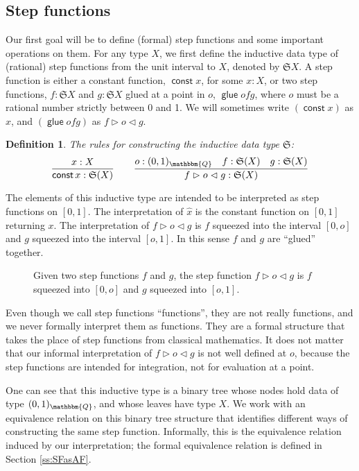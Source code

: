 \documentclass{elsarticle}
\newcommand{\tmop}[1]{\ensuremath{\operatorname{#1}}}
\newtheorem{definition}{Definition}
\newcommand{\SF}{\ensuremath{\mathfrak{S}}}
\newcommand{\glue}[3]{\ensuremath{#1 \vartriangleright #2 \vartriangleleft #3}}
\newcommand{\ou}{\ensuremath{(0,1)_{\mathbbm{Q}}}}
\begin{document}
\subsection{Step functions}\label{ss:Step}\label{ss:InductiveDef}Our first
goal will be to define (formal) step functions and some important
operations on them. For any type $X$, we first define the
inductive data type of (rational) step functions from the unit interval to
$X$, denoted by $\SF X$. A step function is either a constant function,
$\tmop{\mathsf{const}} x$, for some $x : X$, or two
step functions, $f : \SF X$ and $g : \SF X$ glued at a point in $o$,
$\tmop{\mathsf{glue}} o f g$, where $o$ must be a
rational number strictly between 0 and 1. We will sometimes write $( \tmop{\mathsf{const}} x)$ as
$\hat{x}$, and $(\tmop{\mathsf{glue}} o f g)$ as $\glue{f}{o}{g}$.

\begin{definition}
  The rules for constructing the inductive data type {\SF}:
          \[\frac{x : X}{\tmop{\mathsf{const}} x : \SF (X)}\qquad
  \frac{o : \ou \quad f : \SF (X)\quad g :\SF (X)}{\glue{f}{o}{g:{\SF}(X)}}\]
\end{definition}

The elements of this inductive type are intended to be interpreted as step
functions on $[0, 1]$. The interpretation of $\hat{x}$ is the constant
function on $[0, 1]$ returning $x$. The interpretation of {\glue{f}{o}{g}} is
$f$ squeezed into the interval $[0, o]$ and $g$ squeezed into the interval
$[o, 1]$. In this sense $f$ and $g$ are ``glued'' together.

\begin{figure}[h]\begin{center}
  \end{center}
  \caption{Given two step functions $f$ and $g$, the step function
  $\glue{f}{o}{g}$ is $f$ squeezed into $[0, o]$ and $g$ squeezed into $[o,1]$.}
\end{figure}

Even though we call step functions ``functions'', they are not really
functions, and we never formally interpret them as functions. They are a
formal structure that takes the place of step functions from classical
mathematics. It does not matter that our informal interpretation of
$\glue{f}{o}{g}$ is not well defined at $o$, because the step functions are
intended for integration, not for evaluation at a point.

One can see that this inductive type is a binary tree whose nodes hold data of
type {\ou}, and whose leaves have type $X$. We work with an equivalence
relation on this binary tree structure that identifies different ways of
constructing the same step function. Informally, this is the equivalence
relation induced by our interpretation; the formal equivalence relation is
defined in Section \ref{ss:SFasAF}.
\end{document}
